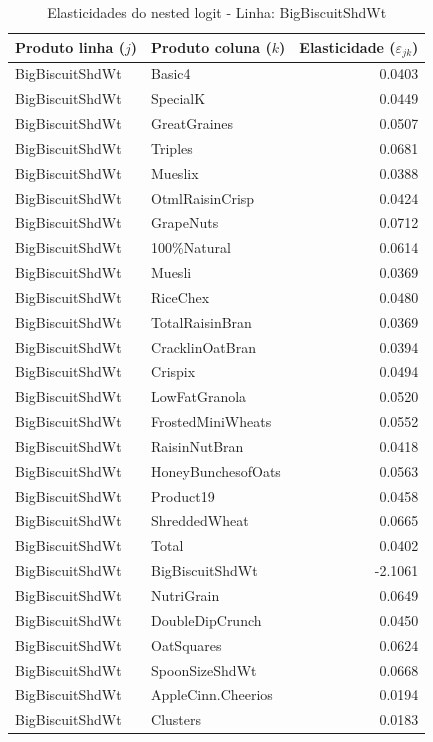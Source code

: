 \begingroup
\begin{table}[H]
\centering
\caption{Elasticidades do nested logit - Linha: BigBiscuitShdWt}
\label{tab:elas-nested-bigbiscuitshdwt}
\small
\begin{tabular}{llr}
\toprule
Produto linha ($j$) & Produto coluna ($k$) & Elasticidade ($\varepsilon_{jk}$) \\
\midrule
BigBiscuitShdWt & Basic4 & 0.0403 \\
BigBiscuitShdWt & SpecialK & 0.0449 \\
BigBiscuitShdWt & GreatGraines & 0.0507 \\
BigBiscuitShdWt & Triples & 0.0681 \\
BigBiscuitShdWt & Mueslix & 0.0388 \\
BigBiscuitShdWt & OtmlRaisinCrisp & 0.0424 \\
BigBiscuitShdWt & GrapeNuts & 0.0712 \\
BigBiscuitShdWt & 100\%Natural & 0.0614 \\
BigBiscuitShdWt & Muesli & 0.0369 \\
BigBiscuitShdWt & RiceChex & 0.0480 \\
BigBiscuitShdWt & TotalRaisinBran & 0.0369 \\
BigBiscuitShdWt & CracklinOatBran & 0.0394 \\
BigBiscuitShdWt & Crispix & 0.0494 \\
BigBiscuitShdWt & LowFatGranola & 0.0520 \\
BigBiscuitShdWt & FrostedMiniWheats & 0.0552 \\
BigBiscuitShdWt & RaisinNutBran & 0.0418 \\
BigBiscuitShdWt & HoneyBunchesofOats & 0.0563 \\
BigBiscuitShdWt & Product19 & 0.0458 \\
BigBiscuitShdWt & ShreddedWheat & 0.0665 \\
BigBiscuitShdWt & Total & 0.0402 \\
BigBiscuitShdWt & BigBiscuitShdWt & -2.1061 \\
BigBiscuitShdWt & NutriGrain & 0.0649 \\
BigBiscuitShdWt & DoubleDipCrunch & 0.0450 \\
BigBiscuitShdWt & OatSquares & 0.0624 \\
BigBiscuitShdWt & SpoonSizeShdWt & 0.0668 \\
BigBiscuitShdWt & AppleCinn.Cheerios & 0.0194 \\
BigBiscuitShdWt & Clusters & 0.0183 \\

\end{tabular}
\end{table}
